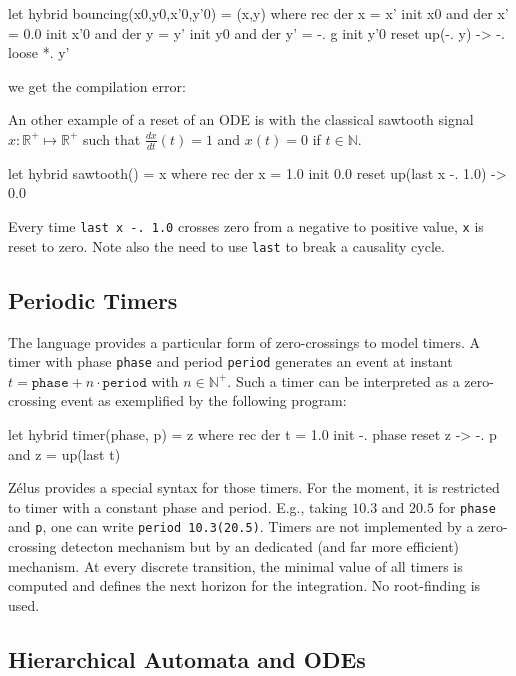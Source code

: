\documentclass[11pt,titlepage,twoside]{report}
\newcommand{\zelus}{{\sf Z\'elus}}
\newcommand{\DotNotation}[1]{\frac{\mathit{d}{#1}}{\mathit{dt}}}
\newcommand{\bR}{\mathbb{R}}
\newcommand{\bN}{\mathbb{N}}
\newcommand{\Marc}[1]{{\bf Marc.} {#1} {\bf Fin}}
\begin{document}
\begin{runverbatim}[include=gravity,fail]
let hybrid bouncing(x0,y0,x'0,y'0) = (x,y) where
 rec der x = x' init x0
 and der x' = 0.0 init x'0
 and der y = y' init y0
 and der y' = -. g init y'0 reset up(-. y) -> -. loose *. y'
\end{runverbatim}
we get the compilation error:
\runverbatimerr{}


An other example of a reset of an \ac{ODE} is with the classical sawtooth
signal $x: \bR^+ \mapsto \bR^+$ such that $\DotNotation{x}(t) = 1$ and
$x(t) = 0$ if $t\in\bN$.

\begin{runverbatim}[withresult]
let hybrid sawtooth() = x where
  rec der x = 1.0 init 0.0 reset up(last x -. 1.0) -> 0.0
\end{runverbatim}
%
Every time \texttt{last x -. 1.0} crosses zero from a negative to positive value,
\texttt{x} is reset to zero. Note also the need to use \texttt{last} to break
a causality cycle.

\subsection{Periodic Timers} %

The language provides a particular form of zero-crossings to model
timers. A timer with phase \texttt{phase} and period \texttt{period} generates
an event at instant $t = \mathtt{phase} + n \cdot \mathtt{period}$ with
$n \in \bN^+$. Such a timer can be interpreted as a zero-crossing event as
exemplified by the following program:

\begin{runverbatim}[withresult]
let hybrid timer(phase, p) = z where
  rec der t = 1.0 init -. phase reset z -> -. p
  and z = up(last t)
\end{runverbatim}

\zelus{} provides a special syntax for those timers. For the moment,
it is restricted to timer with a constant phase and period. E.g.,
taking $10.3$ and $20.5$ for \texttt{phase} and \texttt{p}, one can
write \texttt{period 10.3(20.5)}. Timers are not implemented by a 
zero-crossing detecton mechanism
but by an dedicated (and far more efficient) mechanism. At every discrete transition,
the minimal value of all timers is computed and defines the next horizon for the
integration. No root-finding is used.

\subsection{Hierarchical Automata and ODEs} %
\end{document}
